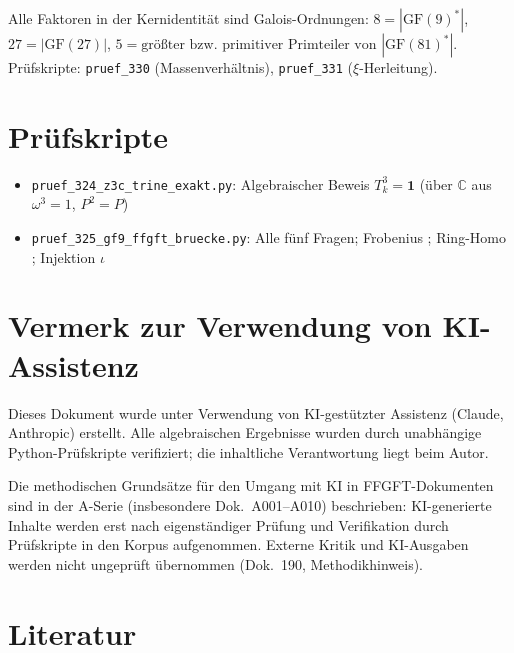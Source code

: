 Alle Faktoren in der Kernidentität sind Galois-Ordnungen:
$8 = |\text{GF}(9)^*|$, $27 = |\text{GF}(27)|$,
$5 = \text{größter bzw.\ primitiver Primteiler von } |\text{GF}(81)^*|$.
Prüfskripte: \texttt{pruef\_330} (Massenverhältnis),
\texttt{pruef\_331} ($\xi$-Herleitung).

\section*{Prüfskripte}
\begin{itemize}
  \item \texttt{pruef\_324\_z3c\_trine\_exakt.py}:
    Algebraischer Beweis $T_k^3=\mathbf{1}$ (über $\mathbb{C}$ aus $\omega^3=1$, $P^2=P$) \BM
  \item \texttt{pruef\_325\_gf9\_ffgft\_bruecke.py}:
    Alle fünf Fragen; Frobenius \BM; Ring-Homo \BM; Injektion $\iota$ \BM
\end{itemize}

\section*{Vermerk zur Verwendung von KI-Assistenz}

\noindent
Dieses Dokument wurde unter Verwendung von KI-gestützter Assistenz
(Claude, Anthropic) erstellt. Alle algebraischen Ergebnisse wurden
durch unabhängige Python-Prüfskripte verifiziert; die inhaltliche
Verantwortung liegt beim Autor.

Die methodischen Grundsätze für den Umgang mit KI in FFGFT-Dokumenten
sind in der A-Serie (insbesondere Dok.~A001--A010) beschrieben:
KI-generierte Inhalte werden erst nach eigenständiger Prüfung und
Verifikation durch Prüfskripte in den Korpus aufgenommen.
Externe Kritik und KI-Ausgaben werden nicht ungeprüft übernommen
(Dok.~190, Methodikhinweis).

\section*{Literatur}

